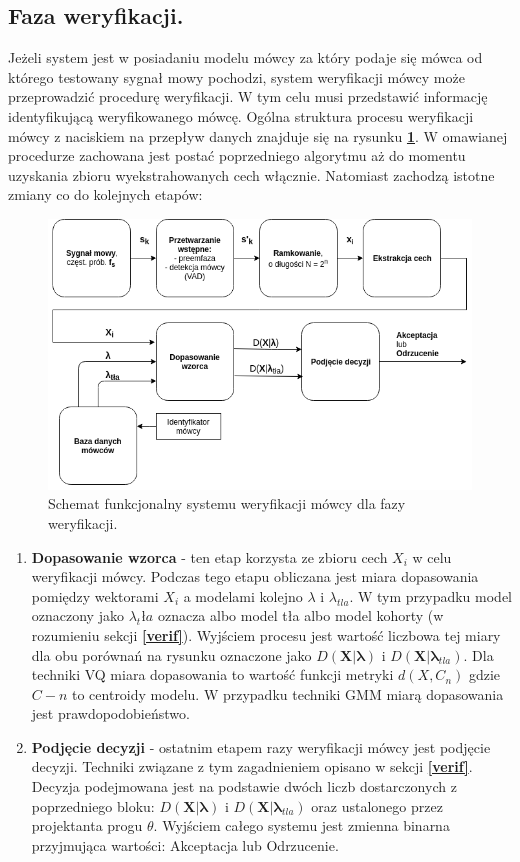 \subsection{Faza weryfikacji.}

Jeżeli system jest w posiadaniu modelu mówcy za który podaje się mówca od którego testowany sygnał mowy pochodzi, system weryfikacji mówcy może przeprowadzić procedurę weryfikacji. W tym celu musi przedstawić informację identyfikującą weryfikowanego mówcę. Ogólna struktura procesu weryfikacji mówcy z naciskiem na przepływ danych znajduje się na rysunku \textbf{\ref{fig:fundiagverif}}. W omawianej procedurze zachowana jest postać poprzedniego algorytmu aż do momentu uzyskania zbioru wyekstrahowanych cech włącznie. Natomiast zachodzą istotne zmiany co do kolejnych etapów:

\begin{figure}[ht!]
  \centering
    \includegraphics[width=1\textwidth]{./fundiagverif.png}
    \caption{\label{fig:fundiagverif} Schemat funkcjonalny systemu weryfikacji mówcy dla fazy weryfikacji.}
\end{figure}

\begin{enumerate}
\item{\textbf{Dopasowanie wzorca}} - ten etap korzysta ze zbioru cech $X_i$ w celu weryfikacji mówcy. Podczas tego etapu obliczana jest miara dopasowania pomiędzy wektorami $X_i$ a modelami kolejno $\lambda$ i $\lambda_{tla}$. W tym przypadku model oznaczony jako $\lambda_tła$ oznacza albo model tła albo model kohorty (w rozumieniu sekcji \textbf{\ref{verif}}). Wyjściem procesu jest wartość liczbowa tej miary dla obu porównań na rysunku oznaczone jako $D(\bm{X}|\bm{\lambda})$ i $D(\bm{X}|\bm{\lambda}_{tla})$. Dla techniki VQ miara dopasowania to wartość funkcji metryki $d(X,C_n)$ gdzie $C-n$ to centroidy modelu. W przypadku techniki GMM miarą dopasowania jest prawdopodobieństwo.
\item{\textbf{Podjęcie decyzji}} - ostatnim etapem razy weryfikacji mówcy jest podjęcie decyzji. Techniki związane z tym zagadnieniem opisano w sekcji \textbf{\ref{verif}}. Decyzja podejmowana jest na podstawie dwóch liczb dostarczonych z poprzedniego bloku: $D(\bm{X}|\bm{\lambda})$ i $D(\bm{X}|\bm{\lambda}_{tla})$ oraz ustalonego przez projektanta progu $\theta$. Wyjściem całego systemu jest zmienna binarna przyjmująca wartości: Akceptacja lub Odrzucenie.
\end{enumerate}

